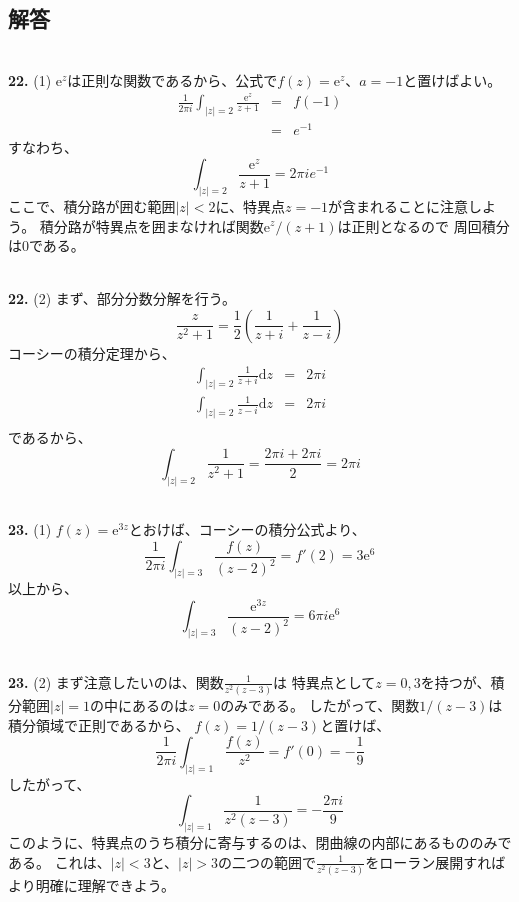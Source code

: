 \documentclass{jarticle}
\newcommand{\diff}{\mathrm d}
\newcommand{\ans}[2]{\noindent\\ {\bf \large #1.} (#2)}
\newcommand{\e}{\mathrm e}
\begin{document}
\subsection{解答}

\ans{22}{1}
$\e^{z}$は正則な関数であるから、公式で$f(z)=\e^z$、$a=-1$と置けばよい。
\begin{eqnarray}
  \frac{1}{2\pi i} \int_{|z|=2} \frac{\e^z}{z+1} &=& f(-1)\\
  &=& e^{-1}
\end{eqnarray}
すなわち、
\begin{equation}
  \int_{|z|=2} \frac{\e^z}{z+1} = 2\pi i e^{-1}
\end{equation}
ここで、積分路が囲む範囲$|z|<2$に、特異点$z=-1$が含まれることに注意しよう。
積分路が特異点を囲まなければ関数$\e^z/(z+1)$は正則となるので
周回積分は$0$である。

\ans{22}{2}
まず、部分分数分解を行う。
\begin{equation}
  \frac{z}{z^2+1} = \frac{1}{2} \left( \frac{1}{z+i} + \frac{1}{z-i} \right)
\end{equation}
コーシーの積分定理から、
\begin{eqnarray}
  \int_{|z|=2} \frac{1}{z+i} \diff z & =& 2 \pi i \\
  \int_{|z|=2} \frac{1}{z-i} \diff z & =& 2 \pi i \\
\end{eqnarray}
であるから、
\begin{equation}
  \int_{|z|=2} \frac{1}{z^2+1} = \frac{2\pi i + 2\pi i}{2} = 2 \pi i
\end{equation}

\ans{23}{1}
$f(z) = \e^{3z}$とおけば、コーシーの積分公式より、
\begin{equation}
  \frac{1}{2\pi i} \int_{|z|=3} \frac{f(z)}{(z-2)^2} = f'(2) = 3\e^{6}
\end{equation}
以上から、
\begin{equation}
  \int_{|z|=3} \frac{\e^{3z}}{(z-2)^2} = 6 \pi i \e^{6}
\end{equation}

\ans{23}{2}
まず注意したいのは、関数$\displaystyle \frac{1}{z^2(z-3)}$は
特異点として$z=0,3$を持つが、積分範囲$|z|=1$の中にあるのは$z=0$のみである。
したがって、関数$1/(z-3)$は積分領域で正則であるから、
$f(z) = 1/(z-3)$と置けば、
\begin{equation}
  \frac{1}{2\pi i} \int_{|z|=1} \frac{f(z)}{z^2} = f'(0) = - \frac{1}{9}
\end{equation}
したがって、
\begin{equation}
  \int_{|z|=1} \frac{1}{z^2(z-3)} =- \frac{2 \pi i}{9}
\end{equation}
このように、特異点のうち積分に寄与するのは、閉曲線の内部にあるもののみである。
これは、$|z|<3$と、$|z|>3$の二つの範囲で$\displaystyle \frac{1}{z^2(z-3)}$をローラン展開すればより明確に理解できよう。
\end{document}
